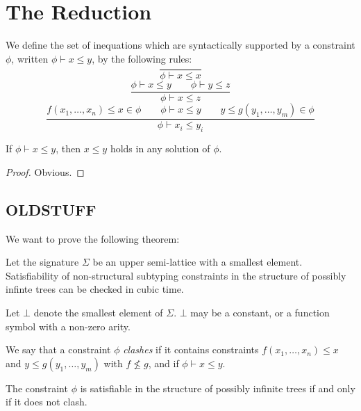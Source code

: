 \section{The Reduction}

We define the set of inequations which are syntactically supported by
a constraint $\phi$, written $\phi \vdash x \leq y$, by the following
rules:
\[\frac{}{\phi \vdash x \leq x}\]
\[\frac{\phi \vdash x \leq y \qquad \phi \vdash y \leq z}{\phi \vdash
  x \leq z}
\]
\[\frac{f(x_1,\ldots,x_n)\leq x \in \phi
  \qquad \phi \vdash x \leq y
  \qquad y \leq g(y_1,\ldots,y_m) \in \phi}{\phi \vdash x_i \leq
  y_i}
\]

\begin{lemma}
  If $\phi\vdash x\leq y$, then $x\leq y$ holds in any solution of
  $\phi$.
\end{lemma}
\begin{proof}
Obvious.
\end{proof}

\subsection{OLDSTUFF}

We want to prove the following theorem:

\begin{satz}
\label{uppersemilatice}
Let the signature $\Sigma$ be an upper semi-lattice with a smallest
element. Satisfiability of non-structural subtyping constraints in the
structure of possibly infinte trees can be checked in cubic time.
\end{satz}

Let $\bot$ denote the smallest element of $\Sigma$. $\bot$ may be a
constant, or a function symbol with a non-zero arity.


We say that a constraint $\phi$ \emph{clashes} if it contains
constraints $f(x_1,\ldots,x_n) \leq x$ and $y \leq g(y_1,\ldots,y_m)$
with $f \not\leq g$, and if $\phi \vdash x \leq y$.

\begin{lemma}
  The constraint $\phi$ is satisfiable in the structure of possibly
  infinite trees if and only if it does not clash.
\end{lemma}

